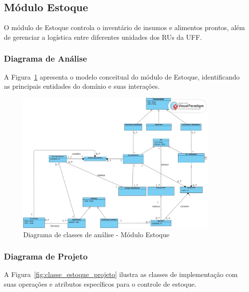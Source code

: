 \documentclass[12pt,a4paper]{article}
\begin{document}
\subsection{Módulo Estoque}

O módulo de Estoque controla o inventário de insumos e alimentos prontos, além de gerenciar a logística entre diferentes unidades dos RUs da UFF.

\subsubsection{Diagrama de Análise}

A Figura~\ref{fig:classe_estoque_analise} apresenta o modelo conceitual do módulo de Estoque, identificando as principais entidades do domínio e suas interações.

\begin{figure}[H]
    \centering
    \includegraphics[width=0.9\textwidth]{diagramas/Diagramas de classe/Estoque_Diagrama_Analise.jpg}
    \caption{Diagrama de classes de análise - Módulo Estoque}
    \label{fig:classe_estoque_analise}
\end{figure}

\subsubsection{Diagrama de Projeto}

A Figura~\ref{fig:classe_estoque_projeto} ilustra as classes de implementação com suas operações e atributos específicos para o controle de estoque.
\end{document}
